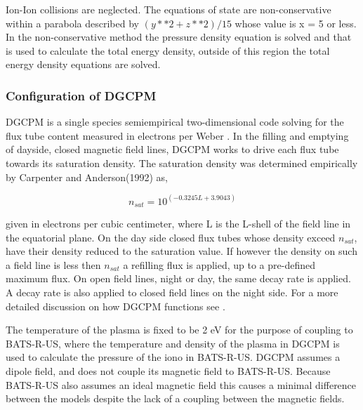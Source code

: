 \documentclass[utf8]{frontiersinFPHY_FAMS}
\begin{document}
Ion-Ion collisions are neglected. The equations of state are non-conservative within a parabola described by $(y**2+z**2) /15$ whose value is x = 5 or less. %
In the non-conservative method the pressure density equation is solved and that is used to calculate the total energy density, outside of this region the total energy density equations are solved. 

\subsubsection{Configuration of DGCPM}

DGCPM is a single species semiempirical two-dimensional code solving for the flux tube content measured in electrons per Weber \citet[Jorgensen et al.(2017)]{Jorgensen2017}. In the filling and emptying of dayside, closed magnetic field lines, DGCPM works to drive each flux tube towards its saturation density. The saturation density was determined empirically by Carpenter and Anderson(1992) as, %

\begin{equation}
	n_{sat} = 10^{(-0.3245L+3.9043)}
	\label{eq:METH1}
\end{equation}

given in electrons per cubic centimeter, where L is the L-shell of the field line in the equatorial plane. On the day side closed flux tubes whose density exceed $n_{sat}$, have their density reduced to the saturation value. If however the density on such a field line is less then $n_{sat}$ a refilling flux is applied, up to a pre-defined maximum flux. On open field lines, night or day, the same decay rate is applied. A decay rate is also applied to closed field lines on the night side. For a more detailed discussion on how DGCPM functions see \citet[Ober et al.(1997)]{Ober1997}. %

The temperature of the plasma is fixed to be 2 eV for the purpose of coupling to BATS-R-US, where the temperature and density of the plasma in DGCPM is used to calculate the pressure of the iono in BATS-R-US. DGCPM assumes a dipole field, and does not couple its magnetic field to BATS-R-US. Because BATS-R-US also assumes an ideal magnetic field this causes a minimal difference between the models despite the lack of a coupling between the magnetic fields. %
\end{document}
